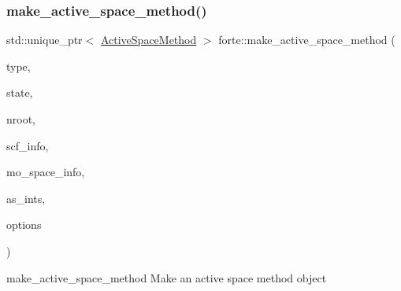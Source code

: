 \mbox{\label{namespaceforte_a7238bba7df981303b148d8cb693547f8}} 
\subsubsection{\texorpdfstring{make\+\_\+active\+\_\+space\+\_\+method()}{make\_active\_space\_method()}}
{\footnotesize\ttfamily std\+::unique\+\_\+ptr$<$ \mbox{\hyperlink{classforte_1_1_active_space_method}{Active\+Space\+Method}} $>$ forte\+::make\+\_\+active\+\_\+space\+\_\+method (\begin{DoxyParamCaption}\item[{const std\+::string \&}]{type,  }\item[{\mbox{\hyperlink{classforte_1_1_state_info}{State\+Info}}}]{state,  }\item[{size\+\_\+t}]{nroot,  }\item[{std\+::shared\+\_\+ptr$<$ \mbox{\hyperlink{classforte_1_1_s_c_f_info}{S\+C\+F\+Info}} $>$}]{scf\+\_\+info,  }\item[{std\+::shared\+\_\+ptr$<$ \mbox{\hyperlink{classforte_1_1_m_o_space_info}{M\+O\+Space\+Info}} $>$}]{mo\+\_\+space\+\_\+info,  }\item[{std\+::shared\+\_\+ptr$<$ \mbox{\hyperlink{classforte_1_1_active_space_integrals}{Active\+Space\+Integrals}} $>$}]{as\+\_\+ints,  }\item[{std\+::shared\+\_\+ptr$<$ \mbox{\hyperlink{classforte_1_1_forte_options}{Forte\+Options}} $>$}]{options }\end{DoxyParamCaption})}



make\+\_\+active\+\_\+space\+\_\+method Make an active space method object 


